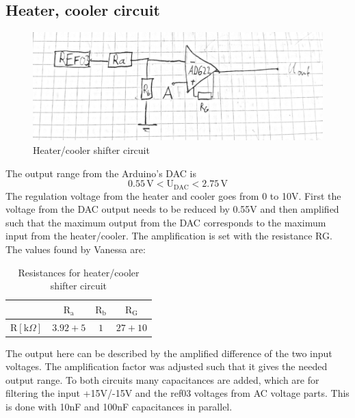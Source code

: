 \documentclass[12pt]{scrartcl}
\begin{document}
    \subsection{Heater, cooler circuit}
      \begin{figure}[h]
        \includegraphics[width = \textwidth]{circ2.png}
        \caption{Heater/cooler shifter circuit}
        \label{fig3}
      \end{figure}
      The output range from the Arduino's DAC is $$0.55\, \text{V} <
      \text{U}_{\text{DAC}} < 2.75\, \text{V}$$
      The regulation voltage from the heater and cooler goes from 0 to 10V. First the
      voltage from the DAC output needs to be reduced by 0.55V and then amplified
      such that the maximum output from the DAC corresponds to the maximum input from
      the heater/cooler. The amplification is set with the resistance RG.
      The values found by Vanessa are: \\
      \begin{table}[H] \label{hcres}
        \begin{tabular}{l|c c c}
          & $\text{R}_\text{a}$ & $\text{R}_\text{b}$ & $\text{R}_\text{G}$ \\
          \hline\vspace{5pt}
          $\text{R}[\text{k}\Omega]$ & $3.92 + 5$ & $1$ & $27+10$
        \end{tabular}
        \flushleft \caption{Resistances for heater/cooler shifter circuit}
      \end{table}
      \noindent The output here can be described by the amplified difference of the two
      input voltages. The amplification factor was adjusted such that it gives
      the needed output range.
      To both circuits many capacitances are added, which are for filtering
      the input +15V/-15V and the ref03 voltages from AC voltage parts. This is done with
      10nF and 100nF capacitances in parallel.
\end{document}

